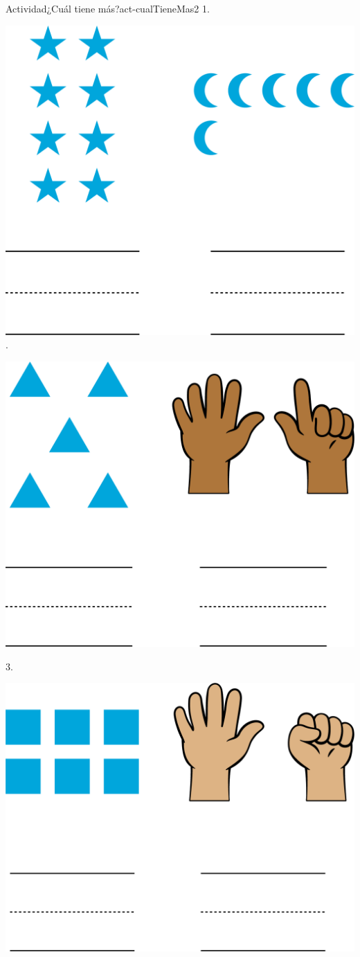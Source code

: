 \documentclass[20pt]{extarticle}
\begin{document}
\begin{activity}{Actividad}{¿Cuál tiene más?}{act-cualTieneMas2}
\vspace{2cm}
1.%
\par
\includegraphics[max width=0.6\linewidth, center]{external/png-source/K.2.D Beta Teacher Guide.Compare.StarsCrescentMoons.png}
.%
\par
\includegraphics[max width=0.6\linewidth, center]{external/png-source/K.2.D Beta Teacher Guide.Compare.Triangles7Fingers.png}
\par
\vspace{4cm}
3.%
\par
\includegraphics[max width=0.6\linewidth, center]{external/png-source/K.2.D Beta Teacher Guide.Compare.Boxes5Fingers.png}
\end{activity}
\end{document}
